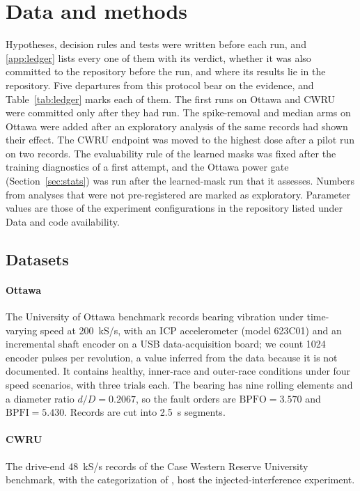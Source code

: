 \section{Data and methods}
\label{sec:methods}

Hypotheses, decision rules and tests were written before each run, and \ref{app:ledger} lists every
one of them with its verdict, whether it was also committed to the repository before the run, and
where its results lie in the repository. Five departures from this protocol bear on the evidence,
and Table~\ref{tab:ledger} marks each of them. The first runs on Ottawa and CWRU were committed only
after they had run. The spike-removal and median arms on Ottawa were added after an exploratory
analysis of the same records had shown their effect. The CWRU endpoint was moved to the highest
dose after a pilot run on two records. The evaluability rule of the learned masks was fixed after
the training diagnostics of a first attempt, and the Ottawa power gate (Section~\ref{sec:stats})
was run after the learned-mask run that it assesses. Numbers from analyses that were not
pre-registered are marked as exploratory. Parameter values are those of the experiment
configurations in the repository listed under Data and code availability.

\subsection{Datasets}
\label{sec:data}

\paragraph{Ottawa}
The University of Ottawa benchmark \citep{huang2018ottawa} records bearing vibration under
time-varying speed at 200~kS/s, with an ICP accelerometer (model 623C01) and an incremental shaft
encoder on a USB data-acquisition board; we count 1024 encoder pulses per revolution, a value
inferred from the data because it is not documented. It contains
healthy, inner-race and outer-race conditions under four speed scenarios, with three trials each.
The bearing has nine rolling elements and a diameter ratio $d/D = 0.2067$, so the fault orders are
$\mathrm{BPFO} = 3.570$ and $\mathrm{BPFI} = 5.430$. Records are cut into 2.5~s segments.

\paragraph{CWRU}
The drive-end 48~kS/s records of the Case Western Reserve University benchmark, with the
categorization of \citet{smith2015cwru}, host the injected-interference experiment.

